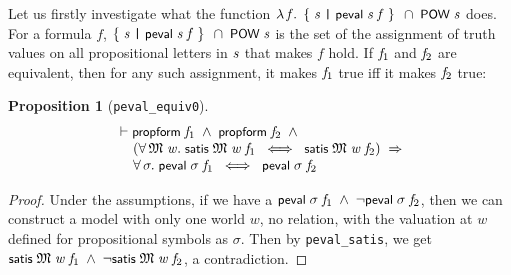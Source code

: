 \documentclass[letterpaper]{article}
\newtheorem{prop}{Proposition}
\renewcommand{\HOLConst}[1]{{\textsf{\upshape\small #1}}}
\renewcommand{\HOLinline}[1]{\ensuremath{#1}}
\newenvironment{holmath}{\begin{displaymath}\begin{array}{l}}{\end{array}\end{displaymath}\ignorespacesafterend}
\begin{document}
Let us firstly investigate what the function \HOLinline{\HOLTokenLambda{}\HOLBoundVar{f}.\;\HOLTokenLeftbrace{}\HOLBoundVar{s}\;\HOLTokenBar{}\;\HOLConst{peval}\;\HOLBoundVar{s}\;\HOLBoundVar{f}\HOLTokenRightbrace{}\;\HOLSymConst{\HOLTokenInter{}}\;\HOLConst{POW}\;\HOLFreeVar{s}} does. For a formula $f$, \HOLinline{\HOLTokenLeftbrace{}\HOLBoundVar{s}\;\HOLTokenBar{}\;\HOLConst{peval}\;\HOLBoundVar{s}\;\HOLFreeVar{f}\HOLTokenRightbrace{}\;\HOLSymConst{\HOLTokenInter{}}\;\HOLConst{POW}\;\HOLFreeVar{s}} is the set of the assignment of truth values on all propositional letters in \HOLinline{\HOLFreeVar{s}} that makes $f$ hold. If \HOLinline{\HOLFreeVar{f\sb{\mathrm{1}}}} and \HOLinline{\HOLFreeVar{f\sb{\mathrm{2}}}} are equivalent, then for any such assignment, it makes \HOLinline{\HOLFreeVar{f\sb{\mathrm{1}}}} true iff it makes \HOLinline{\HOLFreeVar{f\sb{\mathrm{2}}}} true:
\begin{prop}[\texttt{peval_equiv0}]
\begin{holmath}
  \ensuremath{\HOLTokenTurnstile}\HOLConst{propform}\;\HOLFreeVar{f\sb{\mathrm{1}}}\;\HOLSymConst{\HOLTokenConj{}}\;\HOLConst{propform}\;\HOLFreeVar{f\sb{\mathrm{2}}}\;\HOLSymConst{\HOLTokenConj{}}\\
\;\;\;\;\;(\HOLSymConst{\HOLTokenForall{}}\HOLBoundVar{\ensuremath{\mathfrak{M}}}\;\HOLBoundVar{w}.\;\HOLConst{satis}\;\HOLBoundVar{\ensuremath{\mathfrak{M}}}\;\HOLBoundVar{w}\;\HOLFreeVar{f\sb{\mathrm{1}}}\;\HOLSymConst{\HOLTokenEquiv{}}\;\HOLConst{satis}\;\HOLBoundVar{\ensuremath{\mathfrak{M}}}\;\HOLBoundVar{w}\;\HOLFreeVar{f\sb{\mathrm{2}}})\;\HOLSymConst{\HOLTokenImp{}}\\
\;\;\;\;\;\HOLSymConst{\HOLTokenForall{}}\HOLBoundVar{\ensuremath{\sigma}}.\;\HOLConst{peval}\;\HOLBoundVar{\ensuremath{\sigma}}\;\HOLFreeVar{f\sb{\mathrm{1}}}\;\HOLSymConst{\HOLTokenEquiv{}}\;\HOLConst{peval}\;\HOLBoundVar{\ensuremath{\sigma}}\;\HOLFreeVar{f\sb{\mathrm{2}}}
\end{holmath}
\end{prop}
\begin{proof}
Under the assumptions, if we have a \HOLinline{\HOLConst{peval}\;\HOLFreeVar{\ensuremath{\sigma}}\;\HOLFreeVar{f\sb{\mathrm{1}}}\;\HOLSymConst{\HOLTokenConj{}}\;\HOLSymConst{\HOLTokenNeg{}}\HOLConst{peval}\;\HOLFreeVar{\ensuremath{\sigma}}\;\HOLFreeVar{f\sb{\mathrm{2}}}}, then we can construct a model with only one world $w$, no relation, with the valuation at $w$ defined for propositional symbols as $\sigma$. Then by \texttt{peval_satis}, we get \HOLinline{\HOLConst{satis}\;\HOLFreeVar{\ensuremath{\mathfrak{M}}}\;\HOLFreeVar{w}\;\HOLFreeVar{f\sb{\mathrm{1}}}\;\HOLSymConst{\HOLTokenConj{}}\;\HOLSymConst{\HOLTokenNeg{}}\HOLConst{satis}\;\HOLFreeVar{\ensuremath{\mathfrak{M}}}\;\HOLFreeVar{w}\;\HOLFreeVar{f\sb{\mathrm{2}}}}, a contradiction.
\end{proof}
\end{document}
